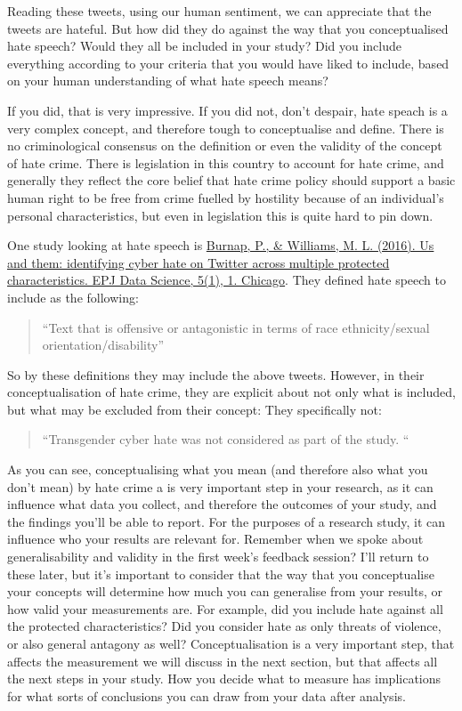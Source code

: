 \documentclass[]{book}
\theoremstyle{definition}
\theoremstyle{definition}
\theoremstyle{definition}
\theoremstyle{remark}
\begin{document}
Reading these tweets, using our human sentiment, we can appreciate that
the tweets are hateful. But how did they do against the way that you
conceptualised hate speech? Would they all be included in your study?
Did you include everything according to your criteria that you would
have liked to include, based on your human understanding of what hate
speech means?

If you did, that is very impressive. If you did not, don't despair, hate
speach is a very complex concept, and therefore tough to conceptualise
and define. There is no criminological consensus on the definition or
even the validity of the concept of hate crime. There is legislation in
this country to account for hate crime, and generally they reflect the
core belief that hate crime policy should support a basic human right to
be free from crime fuelled by hostility because of an individual's
personal characteristics, but even in legislation this is quite hard to
pin down.

One study looking at hate speech is
\href{https://epjdatascience.springeropen.com/articles/10.1140/epjds/s13688-016-0072-6}{Burnap,
P., \& Williams, M. L. (2016). Us and them: identifying cyber hate on
Twitter across multiple protected characteristics. EPJ Data Science,
5(1), 1. Chicago}. They defined hate speech to include as the following:

\begin{quote}
``Text that is offensive or antagonistic in terms of race
ethnicity/sexual orientation/disability''
\end{quote}

So by these definitions they may include the above tweets. However, in
their conceptualisation of hate crime, they are explicit about not only
what is included, but what may be excluded from their concept: They
specifically not:

\begin{quote}
``Transgender cyber hate was not considered as part of the study. ``
\end{quote}

As you can see, conceptualising what you mean (and therefore also what
you don't mean) by hate crime a is very important step in your research,
as it can influence what data you collect, and therefore the outcomes of
your study, and the findings you'll be able to report. For the purposes
of a research study, it can influence who your results are relevant for.
Remember when we spoke about generalisability and validity in the first
week's feedback session? I'll return to these later, but it's important
to consider that the way that you conceptualise your concepts will
determine how much you can generalise from your results, or how valid
your measurements are. For example, did you include hate against all the
protected characteristics? Did you consider hate as only threats of
violence, or also general antagony as well? Conceptualisation is a very
important step, that affects the measurement we will discuss in the next
section, but that affects all the next steps in your study. How you
decide what to measure has implications for what sorts of conclusions
you can draw from your data after analysis.
\end{document}
